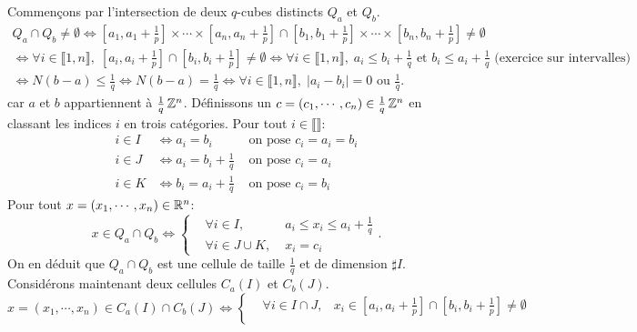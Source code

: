 \begin{demo}
 Commençons par l'intersection de deux $q$-cubes distincts $Q_a$ et $Q_b$.
 \begin{multline*}
  Q_a \cap Q_b \neq \emptyset
   \Leftrightarrow
  [a_1, a_1+\frac{1}{p}] \times \cdots \times [a_n, a_n+\frac{1}{p}] \cap [b_1, b_1+\frac{1}{p}] \times \cdots \times [b_n, b_n+\frac{1}{p}] \neq \emptyset \\
   \Leftrightarrow
  \forall i \in \llbracket 1,n \rrbracket, \; [a_i, a_i+\frac{1}{p}] \cap [b_i, b_i+\frac{1}{p}] \neq \emptyset
   \Leftrightarrow
  \forall i \in \llbracket 1,n \rrbracket, \; a_i \leq b_i + \frac{1}{q} \text{ et } b_i \leq a_i + \frac{1}{q} \text{ (exercice sur intervalles)} \\
   \Leftrightarrow
  N(b-a) \leq \frac{1}{q}
   \Leftrightarrow
  N(b-a) = \frac{1}{q}
   \Leftrightarrow
  \forall i \in \llbracket 1,n \rrbracket, \; |a_i - b_i| = 0 \text{ ou } \frac{1}{q}.
 \end{multline*}
car $a$ et $b$ appartiennent à $\frac{1}{q}\, \mathbb{Z}^n$. Définissons un $c=(c_1,\cdots,c_n) \in \frac{1}{q}\,\mathbb{Z}^n$ en classant les indices $i$ en trois catégories. Pour tout $i \in \llbracket \rrbracket$:
\begin{align*}
 i \in I & \Leftrightarrow a_i = b_i               &\text{ on pose } c_i = a_i = b_i\\
 i \in J & \Leftrightarrow a_i = b_i + \frac{1}{q} &\text{ on pose } c_i = a_i\\
 i \in K & \Leftrightarrow b_i = a_i + \frac{1}{q} &\text{ on pose } c_i = b_i
\end{align*}
Pour tout $x = (x_1, \cdots, x_n) \in \mathbb{R}^n$:
\begin{displaymath}
 x \in Q_a \cap Q_b \Leftrightarrow
 \left\lbrace
   \begin{aligned}
     &\forall i \in I,&\; a_i \leq x_i \leq a_i + \frac{1}{q} \\
     &\forall i \in J\cup K,&\; x_i = c_i
   \end{aligned}
  \right. .
\end{displaymath}
On en déduit que $Q_a \cap Q_b$ est une cellule de taille $\frac{1}{q}$ et de dimension $\sharp I$.\newline
Considérons maintenant deux cellules $C_a(I)$ et $C_b(J)$.
\begin{displaymath}
 x=(x_1,\cdots,x_n) \in C_a(I) \cap C_b(J)
  \Leftrightarrow
    \left\lbrace
      \begin{aligned}
         &\forall i \in I \cap J,& x_i \in [a_i, a_i+\frac{1}{p}] \cap [b_i, b_i+\frac{1}{p}] \neq \emptyset \\

\end{aligned}
\end{displaymath}
\end{demo}
